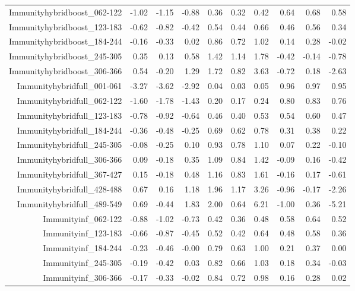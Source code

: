 \begin{table}[ht]
\begin{tabular}{rrrrrrrrrr}
  Immunityhybridboost\_062-122 & -1.02 & -1.15 & -0.88 & 0.36 & 0.32 & 0.42 & 0.64 & 0.68 & 0.58 \\ 
  Immunityhybridboost\_123-183 & -0.62 & -0.82 & -0.42 & 0.54 & 0.44 & 0.66 & 0.46 & 0.56 & 0.34 \\ 
  Immunityhybridboost\_184-244 & -0.16 & -0.33 & 0.02 & 0.86 & 0.72 & 1.02 & 0.14 & 0.28 & -0.02 \\ 
  Immunityhybridboost\_245-305 & 0.35 & 0.13 & 0.58 & 1.42 & 1.14 & 1.78 & -0.42 & -0.14 & -0.78 \\ 
  Immunityhybridboost\_306-366 & 0.54 & -0.20 & 1.29 & 1.72 & 0.82 & 3.63 & -0.72 & 0.18 & -2.63 \\ 
  Immunityhybridfull\_001-061 & -3.27 & -3.62 & -2.92 & 0.04 & 0.03 & 0.05 & 0.96 & 0.97 & 0.95 \\ 
  Immunityhybridfull\_062-122 & -1.60 & -1.78 & -1.43 & 0.20 & 0.17 & 0.24 & 0.80 & 0.83 & 0.76 \\ 
  Immunityhybridfull\_123-183 & -0.78 & -0.92 & -0.64 & 0.46 & 0.40 & 0.53 & 0.54 & 0.60 & 0.47 \\ 
  Immunityhybridfull\_184-244 & -0.36 & -0.48 & -0.25 & 0.69 & 0.62 & 0.78 & 0.31 & 0.38 & 0.22 \\ 
  Immunityhybridfull\_245-305 & -0.08 & -0.25 & 0.10 & 0.93 & 0.78 & 1.10 & 0.07 & 0.22 & -0.10 \\ 
  Immunityhybridfull\_306-366 & 0.09 & -0.18 & 0.35 & 1.09 & 0.84 & 1.42 & -0.09 & 0.16 & -0.42 \\ 
  Immunityhybridfull\_367-427 & 0.15 & -0.18 & 0.48 & 1.16 & 0.83 & 1.61 & -0.16 & 0.17 & -0.61 \\ 
  Immunityhybridfull\_428-488 & 0.67 & 0.16 & 1.18 & 1.96 & 1.17 & 3.26 & -0.96 & -0.17 & -2.26 \\ 
  Immunityhybridfull\_489-549 & 0.69 & -0.44 & 1.83 & 2.00 & 0.64 & 6.21 & -1.00 & 0.36 & -5.21 \\ 
  Immunityinf\_062-122 & -0.88 & -1.02 & -0.73 & 0.42 & 0.36 & 0.48 & 0.58 & 0.64 & 0.52 \\ 
  Immunityinf\_123-183 & -0.66 & -0.87 & -0.45 & 0.52 & 0.42 & 0.64 & 0.48 & 0.58 & 0.36 \\ 
  Immunityinf\_184-244 & -0.23 & -0.46 & -0.00 & 0.79 & 0.63 & 1.00 & 0.21 & 0.37 & 0.00 \\ 
  Immunityinf\_245-305 & -0.19 & -0.42 & 0.03 & 0.82 & 0.66 & 1.03 & 0.18 & 0.34 & -0.03 \\ 
  Immunityinf\_306-366 & -0.17 & -0.33 & -0.02 & 0.84 & 0.72 & 0.98 & 0.16 & 0.28 & 0.02 \\ 

\end{tabular}
\end{table}
